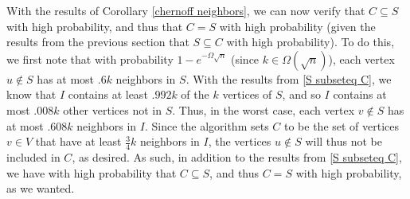 \documentclass{article}
\begin{document}
With the results of Corollary \ref{chernoff neighbors}, we can now verify that
$C \subseteq S$ with high probability, and thus that $C = S$ with high
probability (given the results from the previous section that $S \subseteq C$
with high probability). To do this, we first note that with probability $1 -
e^{-\Omega{\sqrt{n}}}$ (since $k \in \Omega(\sqrt{n})$), each
vertex $u \notin S$ has at most $.6k$ neighbors in $S$. With the results from
\ref{S subseteq C}, we know that $I$ contains at least $.992k$ of the $k$
vertices of $S$, and so $I$ contains at most $.008k$ other vertices not in $S$.
Thus, in the worst case, each vertex $v \notin S$ has at most $.608k$ neighbors
in $I$.
Since the algorithm
sets $C$ to be the set of vertices $v \in V$ that have at least $\frac{3}{4} k$
neighbors in $I$, the vertices $u \notin S$ will thus not be included in $C$,
as desired. As such, in addition to the results from \ref{S subseteq C}, we have
with high probability that $C \subseteq S$, and thus $C =
S$ with high probability, as we wanted.
\end{document}
